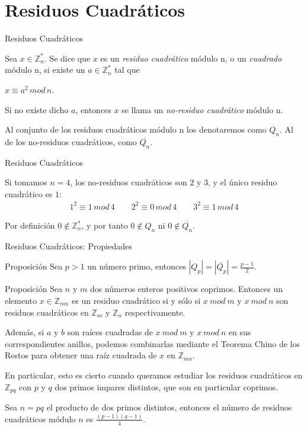\documentclass{beamer}
\begin{document}
\section{Residuos Cuadráticos}

\begin{frame}{Residuos Cuadráticos}
	\begin{definition}
		Sea $x\in \mathbb{Z}^*_n$. Se dice que $x$ es un \textit{residuo cuadrático}
		módulo n, o un \textit{cuadrado} módulo n, si existe un $a \in \mathbb{Z}^*_n$
		tal que
		
		$x \equiv a^2 \, mod \, n$.
		
		Si no existe dicho $a$, entonces $x$ se llama un \textit{no-residuo cuadrático} módulo n.
	\end{definition}

	Al conjunto de los residuos cuadráticos módulo n los denotaremos como $Q_n$.
	Al de los no-residuos cuadráticos, como $\overline{Q_n}$.
\end{frame}


\begin{frame}{Residuos Cuadráticos}
	\begin{example}
		Si tomamos $n=4$, los no-residuos cuadráticos son $2$ y $3$, y el único residuo cuadrático es $1$:
		\begin{align*}
		1^2 \equiv 1 \, mod \, 4 \qquad 2^2 \equiv 0 \, mod \, 4 \qquad  3^2 \equiv 1 \, mod \, 4
		\end{align*}
	\end{example}
	Por definición $0 \notin \mathbb{Z}^*_n$, y por tanto $0 \notin Q_n$ ni $0 \notin \overline{Q_n}$.
\end{frame}

\begin{frame}{Residuos Cuadráticos: Propiedades}
	\begin{block}{Proposición}
		Sea $p>1$ un n\'umero primo, entonces $|Q_p| = |\overline{Q_p}| = \frac{p-1}{2}$.
	\end{block}
	\begin{block}{Proposición}
		Sea $n$ y $m$ dos n\'umeros enteros positivos coprimos. Entonces un elemento
		$x \in {\mathbb Z}_{mn}$ es un residuo cuadr\'atico si y s\'olo si $x~mod~m$
		y $x~mod~n$ son residuos cuadr\'aticos en ${\mathbb Z}_m$ y ${\mathbb Z}_n$
		respectivamente.
		
		Adem\'as, si $a$ y $b$ son ra\'ices cuadradas de $x~mod~m$ y $x~mod~n$ en sus
		correspondientes anillos, podemos combinarlas mediante el Teorema Chino de los Restos
		para obtener una ra\'iz cuadrada de $x$ en ${\mathbb Z}_{mn}$.
		
		En particular, esto es cierto cuando queramos estudiar los residuos cuadr\'aticos en
		${\mathbb Z}_{pq}$ con $p$ y $q$ dos primos impares distintos, que son en particular coprimos.
	\end{block}
	\begin{corollary}
		Sea $n = pq$ el producto de dos primos distintos, entonces el n\'umero de residuos cuadr\'aticos m\'odulo $n$ es $\frac{(p-1)(q-1)}{4}$.
	\end{corollary}
\end{frame}
\end{document}
